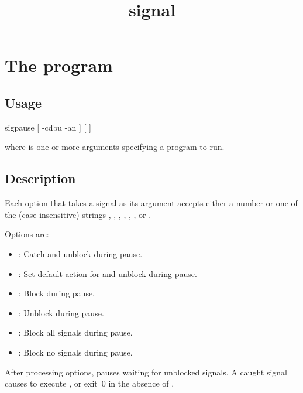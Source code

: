 \documentclass{book}
\title{signal}
\begin{document}
\section{The  program}

\subsection{Usage}
\begin{code}%
  sigpause [ -cdbu  -an ] [  ]
\end{code}
where  is one or more arguments specifying a program to run.

\subsection{Description}
Each option that takes a signal as its argument accepts either a number or one
of the (case insensitive) strings , , , ,
, , or . 

Options are:
\begin{itemize}
\item {}: Catch  and unblock during pause.
\item {}: Set default action for  and unblock during pause.
\item {}: Block  during pause.
\item {}: Unblock  during pause.
\item {}: Block all signals during pause.
\item {}: Block no signals during pause.
\end{itemize}

After processing options,  pauses waiting for unblocked signals.
A caught signal causes  to execute , or exit~0 in the
absence of .
\end{document}
